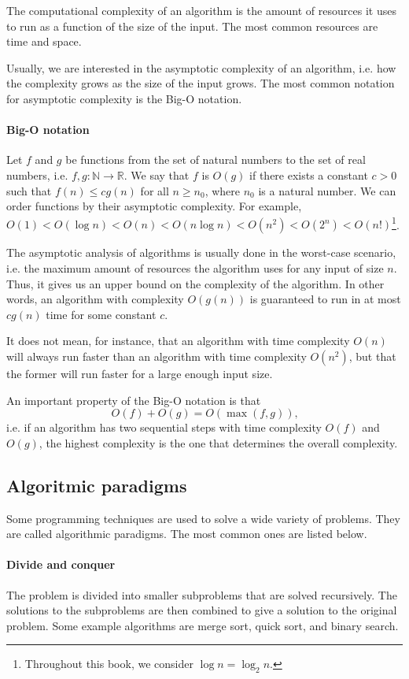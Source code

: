 The computational complexity of an algorithm is the amount of resources it uses to
run as a function of the size of the input.  The most common resources are time and
space.

Usually, we are interested in the asymptotic complexity of an algorithm, i.e. how
the complexity grows as the size of the input grows.  The most common notation for
asymptotic complexity is the Big-O notation.

\paragraph{Big-O notation}  Let $f$ and $g$ be functions from the set of natural numbers
to the set of real numbers, i.e. $f, g : \mathbb{N} \rightarrow \mathbb{R}$.  We say that $f$ is
$O(g)$ if there exists a constant $c > 0$ such that $f(n) \leq c g(n)$ for all $n \geq
n_0$, where $n_0$ is a natural number.
We can order functions by their asymptotic complexity.  For example, $O(1) < O(\log n) <
O(n) < O(n \log n) < O(n^2) < O(2^n) < O(n!)$\footnote{Throughout this book, we consider
$\log n = \log_2 n$.}.

The asymptotic analysis of algorithms is usually done in the worst-case scenario, i.e.
the maximum amount of resources the algorithm uses for any input of size $n$.  Thus,
it gives us an upper bound on the complexity of the algorithm.  In other words, an
algorithm with complexity $O(g(n))$ is guaranteed to run in at most $c g(n)$ time for some
constant $c$.

It does not mean, for instance, that an algorithm with time complexity $O(n)$ will always run
faster than an algorithm with time complexity $O(n^2)$, but that the former will run faster
for a large enough input size.

An important property of the Big-O notation is that
\[
  O(f) + O(g) = O(\max(f, g))\text{,}
\]
i.e. if an algorithm has two sequential steps with time complexity $O(f)$ and $O(g)$, the
highest complexity is the one that determines the overall complexity.

\subsection{Algoritmic paradigms}

Some programming techniques are used to solve a wide variety of problems.  They are called
algorithmic paradigms.  The most common ones are listed below.

\paragraph{Divide and conquer}  The problem is divided into smaller subproblems that are
solved recursively.  The solutions to the subproblems are then combined to give a solution
to the original problem.  Some example algorithms are merge sort, quick sort, and binary
search.

